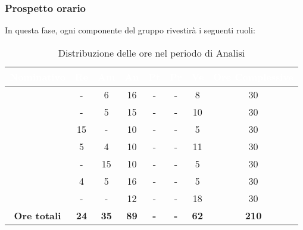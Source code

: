 \subsubsection{Prospetto orario}
In questa fase, ogni componente del gruppo rivestirà i seguenti ruoli:
\begin{table}[H]
	\begin{center}
		\begin{tabular}{ |c c c c c c c c|}
		\rowcolor{darkblue} 
		\textcolor{white}{\textbf{Nominativo}} & \textcolor{white}{\textbf{Re}} & \textcolor{white}{\textbf{Am}} & \textcolor{white}{\textbf{An}} & \textcolor{white}{\textbf{Pt}} & \textcolor{white}{\textbf{Pr}} & \textcolor{white}{\textbf{Ve}} & \textcolor{white}{\textbf{Ore Complessive}} \\ \hline
		\BL 	& - 	& 6 	& 16 	& - 	& - 	& 8 	& 30 \\ \hline
		\FF 	& - 	& 5 	& 15 	& - 	& - 	& 10 	& 30 \\ \hline
		\MM	& 15	& - 	& 10 	& - 	& - 	& 5 	& 30 \\ \hline
		\PC	& 5 	& 4 	& 10 	& - 	& - 	& 11	& 30 \\ \hline
		\TG 	& - 	& 15	& 10 	& - 	& - 	& 5 	& 30 \\ \hline
		\TL 	& 4 	& 5 	& 16 	& - 	& - 	& 5 	& 30 \\ \hline
		\VD 	& - 	& -  	& 12 	& - 	& - 	& 18 	& 30 \\ \hline
		\textbf{Ore totali} & \textbf{24} & \textbf{35} & \textbf{89} & \textbf{-} & \textbf{-} & \textbf{62} & \textbf{210} \\ \hline
		\end{tabular}
	\caption{Distribuzione delle ore nel periodo di Analisi}
	\end{center}
\end{table}
